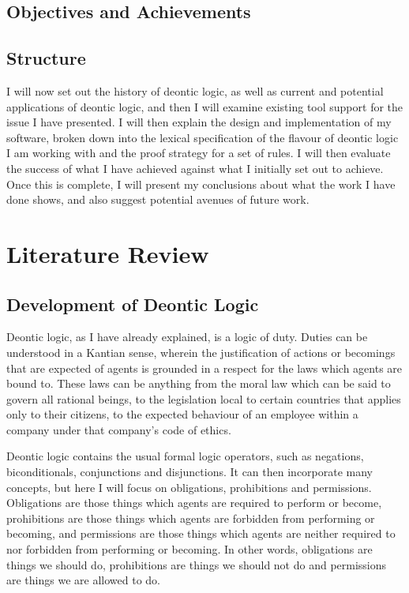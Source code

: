 \documentclass{l4proj}
\begin{document}
\section{Objectives and Achievements}

\section{Structure}
I will now set out the history of deontic logic, as well as current and potential applications of deontic logic, and then I will examine existing tool support for the issue I have presented. I will then explain the design and implementation of my software, broken down into the lexical specification of the flavour of deontic logic I am working with and the proof strategy for a set of rules. I will then evaluate the success of what I have achieved against what I initially set out to achieve. Once this is complete, I will present my conclusions about what the work I have done shows, and also suggest potential avenues of future work. 

\chapter{Literature Review}

\section{Development of Deontic Logic}%
Deontic logic, as I have already explained, is a logic of duty. Duties can be understood in a Kantian sense, wherein the justification of actions or becomings that are expected of agents is grounded in a respect for the laws which agents are bound to\cite{sep-kant-moral}. These laws can be anything from the moral law which can be said to govern all rational beings, to the legislation local to certain countries that applies only to their citizens, to the expected behaviour of an employee within a company under that company's code of ethics. 

Deontic logic contains the usual formal logic operators, such as negations, biconditionals, conjunctions and disjunctions. It can then incorporate many concepts, but here I will focus on obligations, prohibitions and permissions. Obligations are those things which agents are required to perform or become, prohibitions are those things which agents are forbidden from performing or becoming, and permissions are those things which agents are neither required to nor forbidden from performing or becoming. In other words, obligations are things we should do, prohibitions are things we should not do and permissions are things we are allowed to do. 
\end{document}
